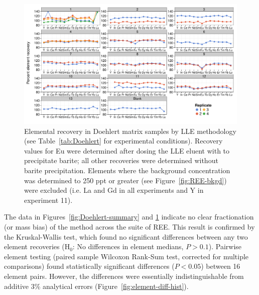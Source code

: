 \begin{figure}
\begin{center}
\includegraphics[width=\textwidth]{Ch4_figures/Exp-wise-LLE-recovery.pdf}
\caption{Elemental recovery in Doehlert matrix samples by LLE methodology (see Table~\ref{tab:Doehlert} for experimental conditions).
Recovery values for Eu were determined after dosing the LLE eluent with  to precipitate barite;
all other recoveries were determined without barite precipitation.
Elements where the background concentration was determined to 250 ppt or greater (see Figure~\ref{fig:REE-bkgd}) were excluded (i.e. La and Gd in all experiments and Y in experiment 11).}
\label{fig:Doehlert-all}
\end{center}
\end{figure}

The data in Figures~\ref{fig:Doehlert-summary} and \ref{fig:Doehlert-all} indicate no clear fractionation (or mass bias) of the method across the suite of REE.
This result is confirmed by the Kruskal-Wallis test, which found no significant differences between any two element recoveries (H$_0$: No differences in element medians, $P > 0.1$).
Pairwise element testing (paired sample Wilcoxon Rank-Sum test, corrected for multiple comparisons) found statistically significant differences ($P < 0.05$) between 16 element pairs.
However, the differences were essentially indistinguishable from additive 3\% analytical errors (Figure~\ref{fig:element-diff-hist}).

